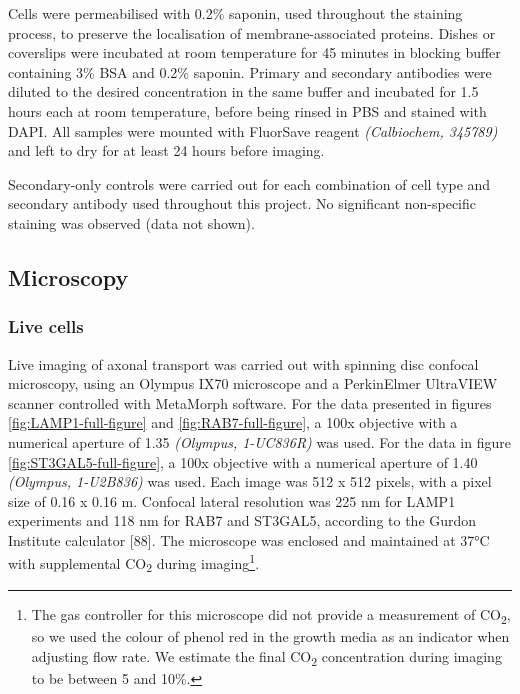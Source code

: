 \documentclass[
  12pt,
  a4paper,
]{book}
\begin{document}
Cells were permeabilised with 0.2\% saponin, used throughout the staining process, to preserve the localisation of membrane-associated proteins. Dishes or coverslips were incubated at room temperature for 45 minutes in blocking buffer containing 3\% BSA and 0.2\% saponin. Primary and secondary antibodies were diluted to the desired concentration in the same buffer and incubated for 1.5 hours each at room temperature, before being rinsed in PBS and stained with DAPI. All samples were mounted with FluorSave reagent \emph{(Calbiochem, 345789)} and left to dry for at least 24 hours before imaging.

Secondary-only controls were carried out for each combination of cell type and secondary antibody used throughout this project. No significant non-specific staining was observed (data not shown).

\hypertarget{microscopy}{%
\subsection{Microscopy}\label{microscopy}}

\hypertarget{live-imaging}{%
\subsubsection{Live cells}\label{live-imaging}}

Live imaging of axonal transport was carried out with spinning disc confocal microscopy, using an Olympus IX70 microscope and a PerkinElmer UltraVIEW scanner controlled with MetaMorph software. For the data presented in figures \ref{fig:LAMP1-full-figure} and \ref{fig:RAB7-full-figure}, a 100x objective with a numerical aperture of 1.35 \emph{(Olympus, 1-UC836R)} was used. For the data in figure \ref{fig:ST3GAL5-full-figure}, a 100x objective with a numerical aperture of 1.40 \emph{(Olympus, 1-U2B836)} was used. Each image was 512 x 512 pixels, with a pixel size of 0.16 x 0.16 \textmu{}m. Confocal lateral resolution was 225 nm for LAMP1 experiments and 118 nm for RAB7 and ST3GAL5, according to the Gurdon Institute calculator {[}88{]}. The microscope was enclosed and maintained at 37°C with supplemental CO\textsubscript{2} during imaging\footnote{The gas controller for this microscope did not provide a measurement of CO\textsubscript{2}, so we used the colour of phenol red in the growth media as an indicator when adjusting flow rate. We estimate the final CO\textsubscript{2} concentration during imaging to be between 5 and 10\%.}.
\end{document}
